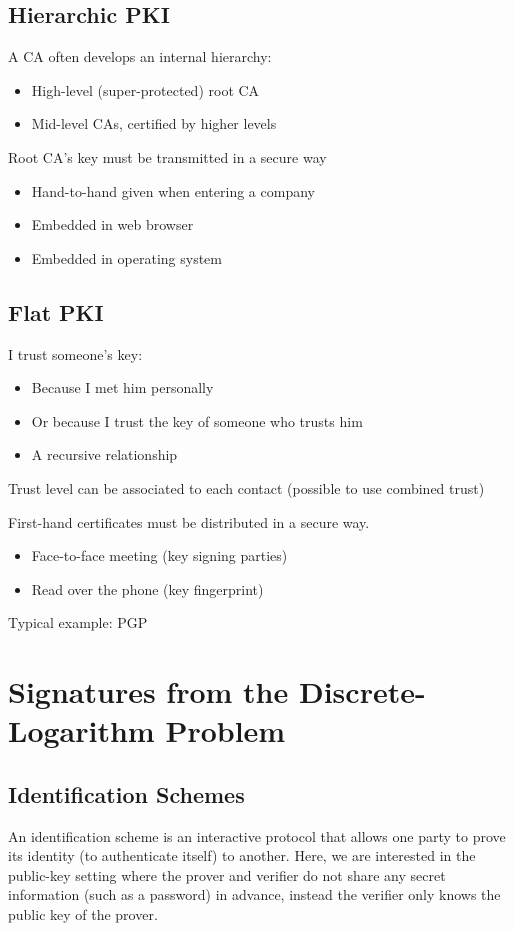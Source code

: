 \documentclass[12pt]{article}
\begin{document}
\subsection{Hierarchic PKI}
A CA often develops an internal hierarchy:
\begin{itemize}
	\item High-level (super-protected) root CA
	\item Mid-level CAs, certified by higher levels
\end{itemize}

Root CA's key must be transmitted in a secure way
\begin{itemize}
	\item Hand-to-hand given when entering a company
	\item Embedded in web browser
	\item Embedded in operating system
\end{itemize}



\subsection{Flat PKI}
I trust someone's key:
\begin{itemize}
	\item Because I met him personally
	\item Or because I trust the key of someone who trusts him
	\item A recursive relationship
\end{itemize}
Trust level can be associated to each contact (possible to use combined trust)

First-hand certificates must be distributed in a secure way.
\begin{itemize}
	\item Face-to-face meeting (key signing parties)
	\item Read over the phone (key fingerprint)
\end{itemize}

Typical example: PGP



\section{Signatures from the Discrete-Logarithm Problem}
\subsection{Identification Schemes}
An identification scheme is an interactive protocol that allows one party to prove its identity (to authenticate itself) to another. Here, we are interested in the public-key setting where the prover and verifier do not share any secret information (such as a password) in advance, instead the verifier only knows the public key of the prover.
\end{document}
